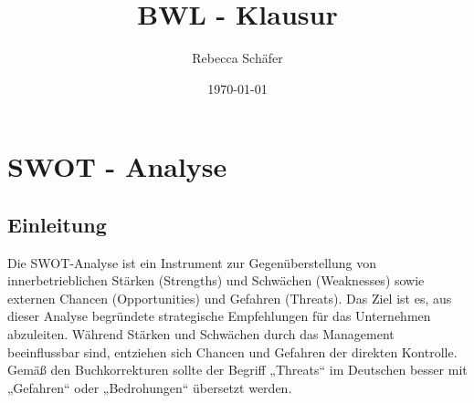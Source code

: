 \documentclass[12pt, a4paper]{article}
\title{BWL - Klausur}
\author{Rebecca Schäfer}
\date{\today}
\begin{document}
\maketitle

\tableofcontents
\newpage

\section{SWOT - Analyse}

\subsection{Einleitung}
Die SWOT-Analyse ist ein Instrument zur Gegenüberstellung von innerbetrieblichen 
Stärken (Strengths) und Schwächen (Weaknesses) sowie externen Chancen 
(Opportunities) und Gefahren (Threats). Das Ziel ist es, aus dieser Analyse 
begründete strategische Empfehlungen für das Unternehmen abzuleiten. 
Während Stärken und Schwächen durch das Management beeinflussbar sind, 
entziehen sich Chancen und Gefahren der direkten Kontrolle. 
Gemäß den Buchkorrekturen sollte der Begriff „Threats“ im Deutschen besser 
mit „Gefahren“ oder „Bedrohungen“ übersetzt werden.
\end{document}
